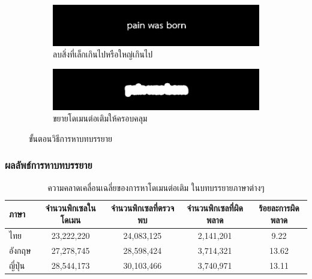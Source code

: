 \documentclass[xcolor=dvipsnames, xetex,serif]{beamer}
\numberwithin{equation}{section}
\begin{document}
\begin{frame}
\begin{figure}[H]
\begin{subfigure}{0.4\linewidth}
                \centering
                \includegraphics[width=0.8\linewidth]{images/subtitle_detection/detection-erode-opening.png}
                \caption{ลบสิ่งที่เล็กเกินไปหรือใหญ่เกินไป}
            \end{subfigure}
            \begin{subfigure}{0.4\linewidth}
                \centering
                \includegraphics[width=0.8\linewidth]{images/subtitle_detection/detection-stoke.png}
                \caption{ขยายโดเมนต่อเติมให้ครอบคลุม}
            \end{subfigure}
            \caption{ขั้นตอนวิธีการหาบทบรรยาย}
        \end{figure}
    \end{frame}
    \begin{frame}
        \frametitle{ผลลัพธ์การหาบทบรรยาย}
        \begin{table}[H]
            \centering
            \footnotesize
            \begin{tabular}[ht]{|l|c|c|c|c|}
                \hline
                ภาษา  & จำนวนพิกเซลในโดเมน & จำนวนพิกเซลที่ตรวจพบ & จำนวนพิกเซลที่ผิดพลาด & ร้อยละการผิดพลาด \\
                \hline
                ไทย & 23,222,220 & 24,083,125 & 2,141,201 & 9.22 \\
                อังกฤษ & 27,278,745 & 28,598,424 & 3,714,321 & 13.62 \\
                ญี่ปุ่น & 28,544,173 & 30,103,466 & 3,740,971 & 13.11 \\
                \hline
            \end{tabular}
            \caption{ความคลาดเคลื่อนเฉลี่ยของการหาโดเมนต่อเติม ในบทบรรยายภาษาต่างๆ}
        \end{table}	
    \end{frame}
\end{document}
